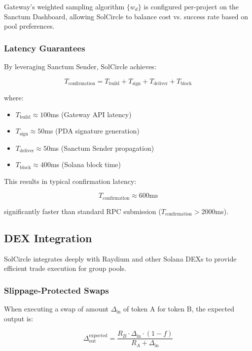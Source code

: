 \documentclass[11pt,a4paper]{article}
\begin{document}
Gateway's weighted sampling algorithm $\{w_d\}$ is configured per-project on the Sanctum Dashboard, allowing SolCircle to balance cost vs. success rate based on pool preferences.

\subsubsection{Latency Guarantees}

By leveraging Sanctum Sender, SolCircle achieves:

\begin{equation}
T_{\text{confirmation}} = T_{\text{build}} + T_{\text{sign}} + T_{\text{deliver}} + T_{\text{block}}
\end{equation}

where:
\begin{itemize}
\item $T_{\text{build}} \approx 100$ms (Gateway API latency)
\item $T_{\text{sign}} \approx 50$ms (PDA signature generation)
\item $T_{\text{deliver}} \approx 50$ms (Sanctum Sender propagation)
\item $T_{\text{block}} \approx 400$ms (Solana block time)
\end{itemize}

This results in typical confirmation latency:

\begin{equation}
T_{\text{confirmation}} \approx 600\text{ms}
\end{equation}

significantly faster than standard RPC submission ($T_{\text{confirmation}} > 2000$ms).

\subsection{DEX Integration}

SolCircle integrates deeply with Raydium and other Solana DEXs to provide efficient trade execution for group pools.

\subsubsection{Slippage-Protected Swaps}

When executing a swap of amount $\Delta_{\text{in}}$ of token A for token B, the expected output is:

\begin{equation}
\Delta_{\text{out}}^{\text{expected}} = \frac{R_B \cdot \Delta_{\text{in}} \cdot (1 - f)}{R_A + \Delta_{\text{in}}}
\end{equation}
\end{document}
